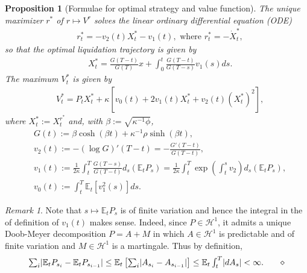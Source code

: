 \documentclass[openany,oneside]{article}
\newtheorem{prop}[thm]{Proposition}
\theoremstyle{definition}
\theoremstyle{remark}
\newtheorem{rem}[thm]{Remark}
\newcommand{\E}{\mathbb{E}} %
\DeclarePairedDelimiter{\abs}{\lvert}{\rvert} %
\newcommand{\ts}{\textstyle}
\newcommand{\closeEqn}{\tag*{$\diamond$}}
\begin{document}
\begin{prop}[Formulae for optimal strategy and value function]\label{main}
The unique maximizer $r^\ast$ of $r\mapsto V^r$ solves the linear ordinary differential equation (ODE)
\begin{align*}
&\ts r^\ast_t = -v_2(t) X_t^{\ast} - v_1(t), \textrm{ where } r^\ast_t = -\dot{X}^\ast_t,
\end{align*}
so that the optimal liquidation trajectory is given by
\begin{align*}
&\ts X^{\ast}_t = \frac{G(T-t)}{G(T)}x + \int_0^t \frac{G(T-t)}{G(T-s)} v_1(s) ds.
\end{align*}
The maximum $V^\ast_t$ is given by
\begin{align*}
&\ts V^\ast_t = P_t X_t^{\ast} + \kappa\left[v_0(t) + 2 v_1(t) X_t^{\ast} + v_2(t) (X_t^{\ast})^2\right],
\end{align*}
where $X_t^{\ast} := X_t^{r^\ast}$ and, with $\beta:=\sqrt{\kappa^{-1}\phi}$,
\begin{align*}
&\ts G(t)  := \beta\cosh(\beta t)+\kappa^{-1}\rho\sinh(\beta t),\\
&\ts v_2(t):= -(\log G)'(T-t) = -\frac{G'(T-t)}{G(T-t)},\\
&\ts v_1(t):= \frac{1}{2\kappa}\int_t^T \frac{G(T-s)}{G(T-t)} d_s(\E_t P_s) = \frac{1}{2\kappa}\int_t^T \exp\left(\int_t^s v_2\right) d_s(\E_t P_s), \\
&\ts v_0(t):= \int_t^T \E_t[v_1^2(s)] ds.\closeEqn
\end{align*}
\end{prop}

\begin{rem}
Note that $s\mapsto \E_t P_s$ is of finite variation and hence the integral in the of definition of $v_1(t)$ makes sense. Indeed, since $P\in \mathcal{H}^1$, it admits a unique Doob-Meyer decomposition $P=A+M$ in which $A\in\mathcal{H}^1$ is predictable and of finite variation and $M\in\mathcal{H}^1$ is a martingale. Thus by definition,
\[
 \ts \sum_i \abs{\E_t P_{s_i} - \E_t P_{s_{i-1}}} \le \E_t\left[\sum_i \abs{A_{s_i} - A_{s_{i-1}}}\right] \le \E_t \int_t^T \abs{d A_s} < \infty.\closeEqn
\]
\end{rem}
\end{document}

